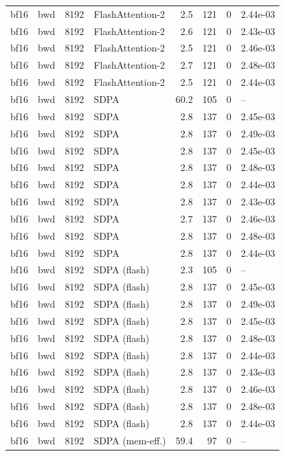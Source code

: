 \begin{tabular}{llrlrrrl}
bf16 & bwd & 8192 & FlashAttention-2 & 2.5 & 121 & 0 & 2.44e-03 \\
bf16 & bwd & 8192 & FlashAttention-2 & 2.6 & 121 & 0 & 2.43e-03 \\
bf16 & bwd & 8192 & FlashAttention-2 & 2.5 & 121 & 0 & 2.46e-03 \\
bf16 & bwd & 8192 & FlashAttention-2 & 2.7 & 121 & 0 & 2.48e-03 \\
bf16 & bwd & 8192 & FlashAttention-2 & 2.5 & 121 & 0 & 2.44e-03 \\
bf16 & bwd & 8192 & SDPA & 60.2 & 105 & 0 & -- \\
bf16 & bwd & 8192 & SDPA & 2.8 & 137 & 0 & 2.45e-03 \\
bf16 & bwd & 8192 & SDPA & 2.8 & 137 & 0 & 2.49e-03 \\
bf16 & bwd & 8192 & SDPA & 2.8 & 137 & 0 & 2.45e-03 \\
bf16 & bwd & 8192 & SDPA & 2.8 & 137 & 0 & 2.48e-03 \\
bf16 & bwd & 8192 & SDPA & 2.8 & 137 & 0 & 2.44e-03 \\
bf16 & bwd & 8192 & SDPA & 2.8 & 137 & 0 & 2.43e-03 \\
bf16 & bwd & 8192 & SDPA & 2.7 & 137 & 0 & 2.46e-03 \\
bf16 & bwd & 8192 & SDPA & 2.8 & 137 & 0 & 2.48e-03 \\
bf16 & bwd & 8192 & SDPA & 2.8 & 137 & 0 & 2.44e-03 \\
bf16 & bwd & 8192 & SDPA (flash) & 2.3 & 105 & 0 & -- \\
bf16 & bwd & 8192 & SDPA (flash) & 2.8 & 137 & 0 & 2.45e-03 \\
bf16 & bwd & 8192 & SDPA (flash) & 2.8 & 137 & 0 & 2.49e-03 \\
bf16 & bwd & 8192 & SDPA (flash) & 2.8 & 137 & 0 & 2.45e-03 \\
bf16 & bwd & 8192 & SDPA (flash) & 2.8 & 137 & 0 & 2.48e-03 \\
bf16 & bwd & 8192 & SDPA (flash) & 2.8 & 137 & 0 & 2.44e-03 \\
bf16 & bwd & 8192 & SDPA (flash) & 2.8 & 137 & 0 & 2.43e-03 \\
bf16 & bwd & 8192 & SDPA (flash) & 2.8 & 137 & 0 & 2.46e-03 \\
bf16 & bwd & 8192 & SDPA (flash) & 2.8 & 137 & 0 & 2.48e-03 \\
bf16 & bwd & 8192 & SDPA (flash) & 2.8 & 137 & 0 & 2.44e-03 \\
bf16 & bwd & 8192 & SDPA (mem-eff.) & 59.4 & 97 & 0 & -- \\

\end{tabular}
